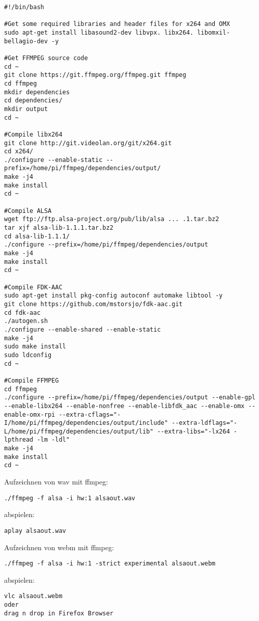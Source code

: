 \begin{verbatim}
#!/bin/bash

#Get some required libraries and header files for x264 and OMX
sudo apt-get install libasound2-dev libvpx. libx264. libomxil-bellagio-dev -y

#Get FFMPEG source code
cd ~
git clone https://git.ffmpeg.org/ffmpeg.git ffmpeg
cd ffmpeg
mkdir dependencies
cd dependencies/
mkdir output
cd ~

#Compile libx264
git clone http://git.videolan.org/git/x264.git
cd x264/
./configure --enable-static --prefix=/home/pi/ffmpeg/dependencies/output/
make -j4
make install
cd ~

#Compile ALSA
wget ftp://ftp.alsa-project.org/pub/lib/alsa ... .1.tar.bz2
tar xjf alsa-lib-1.1.1.tar.bz2
cd alsa-lib-1.1.1/
./configure --prefix=/home/pi/ffmpeg/dependencies/output
make -j4
make install
cd ~

#Compile FDK-AAC
sudo apt-get install pkg-config autoconf automake libtool -y
git clone https://github.com/mstorsjo/fdk-aac.git
cd fdk-aac
./autogen.sh
./configure --enable-shared --enable-static
make -j4
sudo make install
sudo ldconfig
cd ~

#Compile FFMPEG
cd ffmpeg
./configure --prefix=/home/pi/ffmpeg/dependencies/output --enable-gpl --enable-libx264 --enable-nonfree --enable-libfdk_aac --enable-omx --enable-omx-rpi --extra-cflags="-I/home/pi/ffmpeg/dependencies/output/include" --extra-ldflags="-L/home/pi/ffmpeg/dependencies/output/lib" --extra-libs="-lx264 -lpthread -lm -ldl"
make -j4
make install
cd ~

\end{verbatim}	
	
Aufzeichnen von wav mit ffmpeg:
\begin{verbatim}./ffmpeg -f alsa -i hw:1 alsaout.wav \end{verbatim}
abspielen:
\begin{verbatim}aplay alsaout.wav \end{verbatim}
Aufzeichnen von webm mit ffmpeg:
\begin{verbatim}./ffmpeg -f alsa -i hw:1 -strict experimental alsaout.webm  \end{verbatim}
abspielen:
\begin{verbatim}
vlc alsaout.webm 
oder
drag n drop in Firefox Browser
\end{verbatim}


